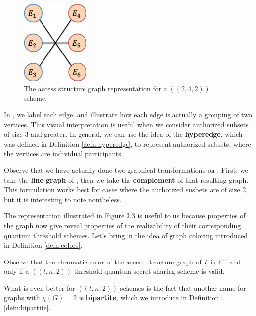 \begin{figure}[ht]
	\label{2-4-2-graph}
	\begin{center}
		\includegraphics[width=0.3\textwidth]{Images/ch3-fig3.png}
	\end{center}
	\caption{The access structure graph representation for a $((2,4,2))$ scheme.}
\end{figure}

In , we label each edge, and illustrate how each edge is actually a grouping of two vertices. This visual interpretation is useful when we consider authorized subsets of size 3 and greater. In general, we can use the idea of the \textbf{hyperedge}, which was defined in Definition \ref{defn:hyperedge}, to represent authorized subsets, where the vertices are individual participants.

\begin{remark}
	Observe that we have actually done two graphical transformations on . First, we take the \textbf{line graph} of , then we take the \textbf{complement} of that resulting graph. This formulation works best for cases where the authorized susbets are of size 2, but it is interesting to note nontheless.
\end{remark}

The representation illustrated in Figure 3.3 is useful to us because properties of the graph now give reveal properties of the realizability of their corresponding quantum threshold schemes. Let's bring in the idea of graph coloring introduced in Definition \ref{defn:colors}.

\begin{remark}
	Observe that the chromatic color of the access structure graph of $\Gamma$ is 2 if and only if a $((t,n,2))$-threshold quantum secret sharing scheme is valid.
\end{remark}

What is even better for $((t,n,2))$ schemes is the fact that another name for graphs with $\chi(G)=2$ is \textbf{bipartite}, which we introduce in Definition \ref{defn:bipartite}.

